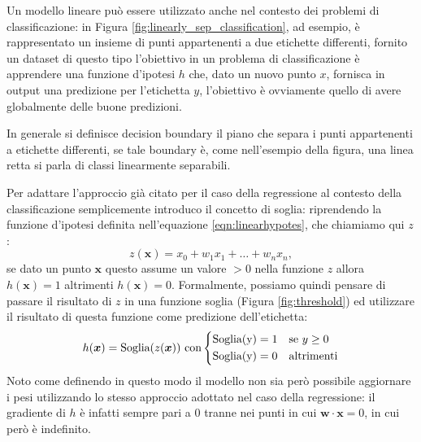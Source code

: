 \documentclass[../../main.tex]{subfiles}
\begin{document}
    Un modello lineare può essere utilizzato anche nel contesto dei problemi di classificazione: in Figura \ref{fig:linearly_sep_classification}, ad esempio,  è rappresentato un insieme di punti appartenenti a due etichette differenti, fornito un dataset di questo tipo l'obiettivo in un problema di classificazione è apprendere una funzione d'ipotesi $h$ che, dato un nuovo punto $x$, fornisca in output una predizione per l'etichetta $y$, l'obiettivo è ovviamente quello di avere globalmente delle buone predizioni. 
    
    In generale si definisce decision boundary il piano che separa i punti appartenenti a etichette differenti, se tale boundary è, come nell'esempio della figura, una linea retta si parla di classi linearmente separabili. 
    
    Per adattare l'approccio già citato per il caso della regressione al contesto della classificazione semplicemente introduco il concetto di soglia: riprendendo la funzione d'ipotesi definita nell'equazione \ref{eqn:linearhypotes}, che chiamiamo qui $z$:
    \[z(\boldsymbol{x}) = x_0 + w_1x_1 + \dots + w_nx_n,\]
    se dato un punto $\boldsymbol{x}$ questo assume un valore $> 0$ nella funzione $z$ allora $h(\boldsymbol{x}) = 1$ altrimenti $h(\boldsymbol{x}) = 0$. Formalmente, possiamo quindi pensare di passare il risultato di $z$ in una funzione soglia (Figura \ref{fig:threshold}) ed utilizzare il risultato di questa funzione come predizione dell'etichetta:
    \[h(\boldsymbol{x}) = \text{Soglia}(z(\boldsymbol{x})) \ \text{con} 
    \begin{dcases}
        \text{Soglia(y)} = 1 & \text{se} \ y \geq 0 \\
        \text{Soglia(y)} = 0 & \text{altrimenti} \\
    \end{dcases}\]
    Noto come definendo in questo modo il modello non sia però possibile aggiornare i pesi utilizzando lo stesso approccio adottato nel caso della regressione: il gradiente di $h$ è infatti sempre pari a 0 tranne nei punti in cui $\boldsymbol{w} \cdot \boldsymbol{x} = 0$, in cui però è indefinito.
    
\end{document}
